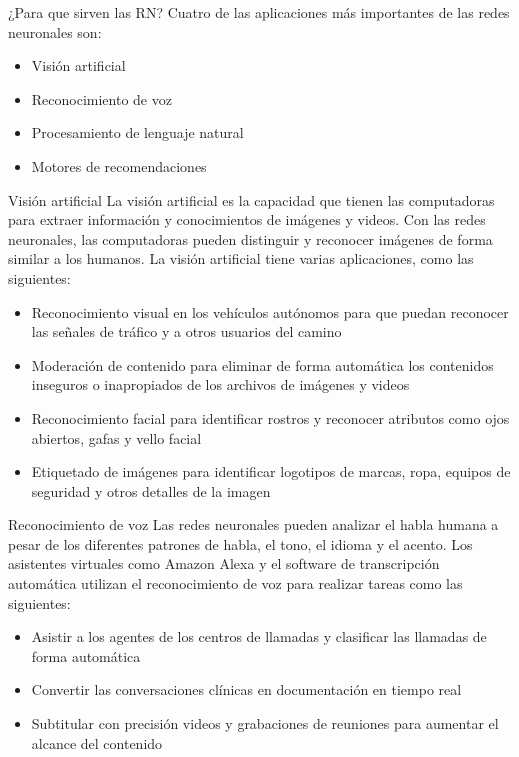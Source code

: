 \documentclass[11pt,aspectratio=169]{beamer}
\begin{document}
\begin{frame}{¿Para que sirven las RN?}
	Cuatro de las aplicaciones más importantes de las redes neuronales son: \pause
	\begin{itemize}
		\item Visión artificial \pause
		\item Reconocimiento de voz\pause
		\item Procesamiento de lenguaje natural\pause
		\item Motores de recomendaciones
	\end{itemize}
\end{frame}

\begin{frame}{Visión artificial}
	La visión artificial es la capacidad que tienen las computadoras para extraer información y conocimientos de imágenes y videos.\pause 
	Con las redes neuronales, las computadoras pueden distinguir y reconocer imágenes de forma similar a los humanos.\pause
	La visión artificial tiene varias aplicaciones, como las siguientes:\pause
	\begin{itemize}
		\item Reconocimiento visual en los vehículos autónomos para que puedan reconocer las señales de tráfico y a otros usuarios del camino \pause
		\item Moderación de contenido para eliminar de forma automática los contenidos inseguros o inapropiados de los archivos de imágenes y videos\pause
		\item Reconocimiento facial para identificar rostros y reconocer atributos como ojos abiertos, gafas y vello facial\pause
		\item Etiquetado de imágenes para identificar logotipos de marcas, ropa, equipos de seguridad y otros detalles de la imagen
	\end{itemize}
\end{frame}

\begin{frame}{Reconocimiento de voz}
	Las redes neuronales pueden analizar el habla humana a pesar de los diferentes patrones de habla, el tono, el idioma y el acento.\pause
	Los asistentes virtuales como Amazon Alexa y el software de transcripción automática utilizan el reconocimiento de voz para realizar
	tareas como las siguientes:\pause
	\begin{itemize}
		\item Asistir a los agentes de los centros de llamadas y clasificar las llamadas de forma automática\pause
		\item Convertir las conversaciones clínicas en documentación en tiempo real\pause
		\item Subtitular con precisión videos y grabaciones de reuniones para aumentar el alcance del contenido	
	\end{itemize}
\end{frame}
\end{document}
